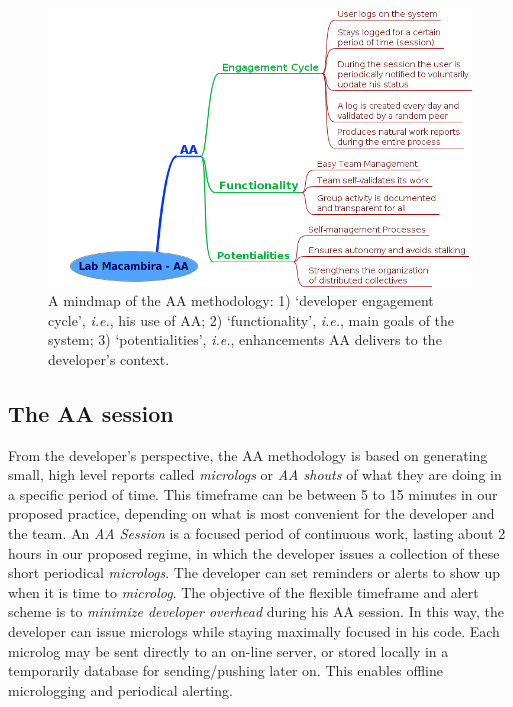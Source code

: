 \documentclass{article}
\newcommand{\ie}{{\it i.e.}}
\begin{document}
\begin{figure}
\begin{center}
   \includegraphics[width=0.8\linewidth,keepaspectratio=true]{figs/aa-mm2.png}
\end{center}
   \caption{
   A mindmap of the AA methodology: 1) `developer engagement cycle', \ie, his use
   of AA; 2) `functionality', \ie, main goals of the system; 3) `potentialities',
   \ie, enhancements AA delivers to the developer's context. 
   }
\label{fig:mm}
\end{figure}

\subsection{The AA session}

From the developer's perspective, the AA methodology is based on generating
small, high level reports called \emph{micrologs} or \emph{AA shouts} of what
they are doing in a specific period of time.  This timeframe can be
between 5 to 15 minutes in our proposed practice, depending on what is most
convenient for the developer and the team. An \emph{AA Session} is a focused
period of continuous work, lasting about 2 hours in our proposed regime, in
which the developer issues a collection of these short periodical
\emph{micrologs}. The developer can set reminders or alerts to show up when it
is time to \emph{microlog}. The objective of the flexible timeframe and alert
scheme is to \emph{minimize developer overhead} during his AA session.  In this
way, the developer can issue micrologs while staying maximally focused in
his code. Each microlog may be sent directly to an on-line server, or stored
locally in a temporarily database for sending/pushing later on.  This enables
offline micrologging and periodical alerting.
\end{document}
